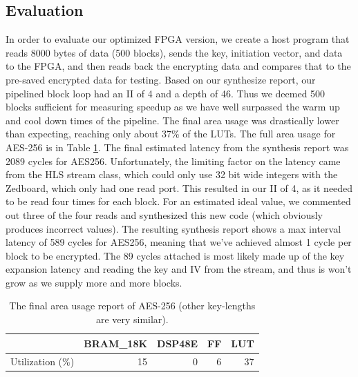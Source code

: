\subsection{Evaluation}
In order to evaluate our optimized FPGA version, we create a host program that reads 8000 bytes of data (500 blocks), sends the key, initiation vector, and data to the FPGA, and then reads back the encrypting data and compares that to the pre-saved encrypted data for testing. Based on our synthesize report, our pipelined block loop had an II of 4 and a depth of 46. Thus we deemed 500 blocks sufficient for measuring speedup as we have well surpassed the warm up and cool down times of the pipeline. The final area usage was drastically lower than expecting, reaching only about 37\% of the LUTs. The full area usage for AES-256 is in Table \ref{table:aesarea}. The final estimated latency from the synthesis report was 2089 cycles for AES256. Unfortunately, the limiting factor on the latency came from the HLS stream class, which could only use 32 bit wide integers with the Zedboard, which only had one read port. This resulted in our II of 4, as it needed to be read four times for each block. For an estimated ideal value, we commented out three of the four reads and synthesized this new code (which obviously produces incorrect values). The resulting synthesis report shows a max interval latency of 589 cycles for AES256, meaning that we've achieved almost 1 cycle per block to be encrypted. The 89 cycles attached is most likely made up of the key expansion latency and reading the key and IV from the stream, and thus is won't grow as we supply more and more blocks. 

\begin{table}[h]
\begin{center}
\begin{tabular}{@{}r r r r r@{}}
\toprule
& BRAM\_18K &  DSP48E &   FF    &  LUT \\ \midrule
Utilization (\%)  &       15 &      0 &       6 &     37 \\ \bottomrule
\end{tabular}
\label{table:aesarea}
\caption{The final area usage report of AES-256 (other key-lengths are very similar).}
\end{center}
\end{table}


